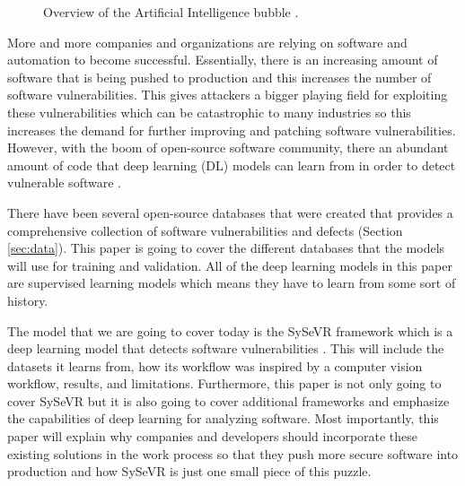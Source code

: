 \documentclass[12pt,twocolumn,letterpaper]{article}
\begin{document}
\begin{figure}[t]
    \centering

    \caption{Overview of the Artificial Intelligence bubble \cite{Oppermann22}.}
    \label{fig:intro-0}
\end{figure}


More and more companies and organizations are relying on software and automation to become successful. 
Essentially, there is an increasing amount of software that is being pushed to production and this increases 
the number of software vulnerabilities. This gives attackers a bigger playing field for exploiting these 
vulnerabilities which can be catastrophic to many industries so this increases the demand for further improving 
and patching software vulnerabilities. However, with the boom of open-source software community, there an 
abundant amount of code that deep learning (DL) models can learn from in order to detect vulnerable software 
\cite{Lin20}. 

There have been several open-source databases that were created that provides a comprehensive collection of 
software vulnerabilities and defects (Section \ref{sec:data}). This paper is going to cover the different databases that the models 
will use for training and validation. All of the deep learning models in this paper are supervised learning 
models which means they have to learn from some sort of history.

The model that we are going to cover today is the SySeVR framework which is a deep learning model that detects 
software vulnerabilities \cite{Li22}. This will include the datasets it learns from, how its workflow was inspired by 
a computer vision workflow, results, and limitations. Furthermore, this paper is not only going to cover 
SySeVR but it is also going to cover additional frameworks and emphasize the capabilities of deep 
learning for analyzing software. Most importantly, this paper will explain why companies and developers 
should incorporate these existing solutions in the work process so that they push more secure software 
into production and how SySeVR is just one small piece of this puzzle.
\end{document}
